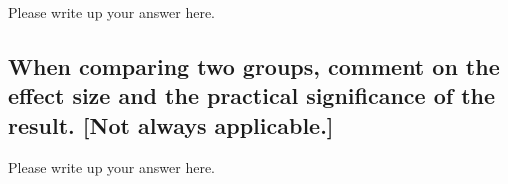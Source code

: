 \documentclass[
]{book}
\begin{document}
Please write up your answer here.

\hypertarget{when-comparing-two-groups-comment-on-the-effect-size-and-the-practical-significance-of-the-result.-not-always-applicable.}{%
\subsection*{When comparing two groups, comment on the effect size and the practical significance of the result. {[}Not always applicable.{]}}\label{when-comparing-two-groups-comment-on-the-effect-size-and-the-practical-significance-of-the-result.-not-always-applicable.}}

Please write up your answer here.

  
\end{document}
